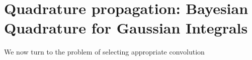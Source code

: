 \documentclass[twoside]{article}
\begin{document}
\begin{figure*}
\caption{}
\end{figure*}

\begin{figure*}
\caption{}
\end{figure*}


\section{Quadrature propagation: Bayesian Quadrature for Gaussian Integrals}
\label{sec:active}

We now turn to the problem of selecting appropriate convolution 



\end{document}
